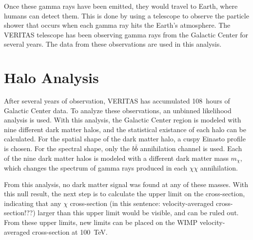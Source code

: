   Once these gamma rays have been emitted, they would travel to Earth, where humans can detect them.
  This is done by using a telescope to observe the particle shower that occurs when each gamma ray hits the Earth's atmosphere.
  The VERITAS telescope has been observing gamma rays from the Galactic Center for several years.
  The data from these observations are used in this analysis.


\section{Halo Analysis}
  After several years of observation, VERITAS has accumulated \SI{108}{hours} of Galactic Center data.
  To analyze these observations, an unbinned likelihood analysis is used.
  With this analysis, the Galactic Center region is modeled with nine different dark matter halos, and the statistical existance of each halo can be calculated.
  For the spatial shape of the dark matter halo, a cuspy Einasto profile is chosen.
  For the spectral shape, only the $b\bar{b}$ annihilation channel is used.
  Each of the nine dark matter halos is modeled with a different dark matter mass $m_{\chi}$, which changes the spectrum of gamma rays produced in each $\chi\chi$ annihilation.
  
  From this analysis, no dark matter signal was found at any of these masses.
  With this null result, the next step is to calculate the upper limit on the cross-section, indicating that any $\chi$ cross-section {\color{red}(in this sentence: velocity-averaged cross-section!??)} larger than this upper limit would be visible, and can be ruled out.
  From these upper limits, new limits can be placed on the WIMP velocity-averaged cross-section at \SI{100}{TeV}.


